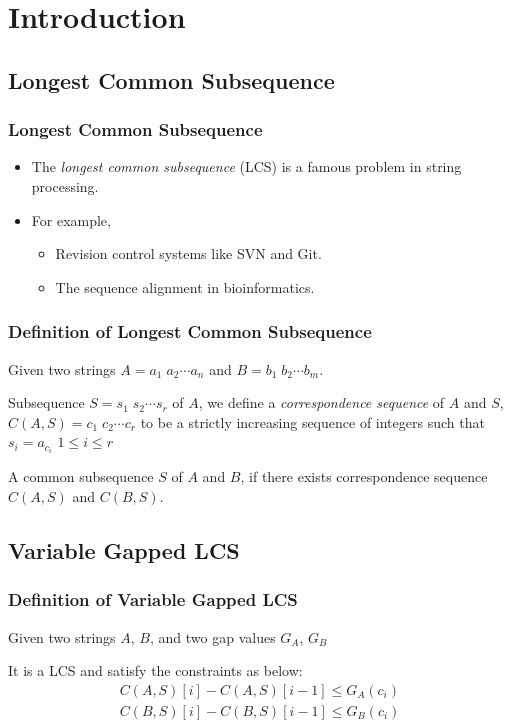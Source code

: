 \section{Introduction}

\subsection{Longest Common Subsequence}

\begin{frame}
    \frametitle{Longest Common Subsequence}
    \begin{itemize}
        \setlength\itemsep{1em}
        \item 
            The {\em longest common subsequence} (LCS) is a famous
            problem in string processing.
        \item 
            For example, 
            \begin{itemize}
                \setlength\itemsep{1em}
                \item 
                    Revision control systems like SVN and Git.
                \item 
                    The sequence alignment in bioinformatics.
            \end{itemize}
    \end{itemize}
\end{frame}

\begin{frame}
    \frametitle{Definition of Longest Common Subsequence}
    Given two strings $A = a_1 \; a_2 \cdots a_n$ and $B = b_1 \; b_2
    \cdots b_m$.
    \begin{definition}
        Subsequence $S = s_1 \; s_2 \cdots s_r$ of $A$, we define a
        \emph{correspondence sequence} of $A$ and $S$, $C(A, S) = c_1 \;
        c_2 \cdots c_r$ to be a strictly increasing sequence of integers
        such that $s_i = a_{c_i}$ $1 \le i \le r$
	\end{definition}
	\begin{definition}
        A common subsequence $S$ of $A$ and $B$, if there exists
        correspondence sequence $C(A, S)$ and $C(B, S)$.
	\end{definition}
\end{frame}



\subsection{Variable Gapped LCS}
\begin{frame}
    \frametitle{Definition of Variable Gapped LCS}
    Given two strings $A$, $B$, and two gap values $G_{A}$, $G_{B}$
    \begin{definition}
        It is a LCS and satisfy the constraints as below:
        \begin{align*}
            C(A, S)[i] - C(A, S)[i-1] \le G_{A}(c_i) \\
            C(B, S)[i] - C(B, S)[i-1] \le G_{B}(c_i)
        \end{align*}
    \end{definition}
\end{frame}

